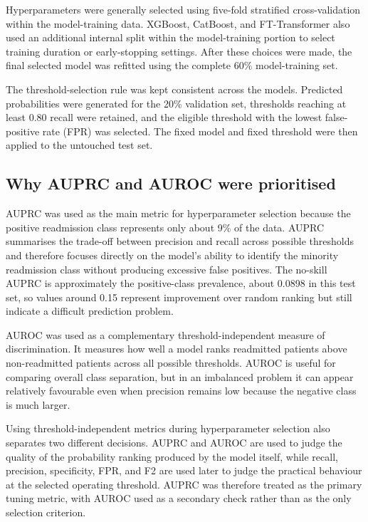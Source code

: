 \documentclass[11pt,a4paper]{article}
\begin{document}
Hyperparameters were generally selected using five-fold stratified cross-validation within the model-training data. XGBoost, CatBoost, and FT-Transformer also used an additional internal split within the model-training portion to select training duration or early-stopping settings. After these choices were made, the final selected model was refitted using the complete 60\% model-training set.

The threshold-selection rule was kept consistent across the models. Predicted probabilities were generated for the 20\% validation set, thresholds reaching at least 0.80 recall were retained, and the eligible threshold with the lowest false-positive rate (FPR) was selected. The fixed model and fixed threshold were then applied to the untouched test set.

\subsection{Why AUPRC and AUROC were prioritised}

AUPRC was used as the main metric for hyperparameter selection because the positive readmission class represents only about 9\% of the data. AUPRC summarises the trade-off between precision and recall across possible thresholds and therefore focuses directly on the model's ability to identify the minority readmission class without producing excessive false positives. The no-skill AUPRC is approximately the positive-class prevalence, about 0.0898 in this test set, so values around 0.15 represent improvement over random ranking but still indicate a difficult prediction problem.

AUROC was used as a complementary threshold-independent measure of discrimination. It measures how well a model ranks readmitted patients above non-readmitted patients across all possible thresholds. AUROC is useful for comparing overall class separation, but in an imbalanced problem it can appear relatively favourable even when precision remains low because the negative class is much larger.

Using threshold-independent metrics during hyperparameter selection also separates two different decisions. AUPRC and AUROC are used to judge the quality of the probability ranking produced by the model itself, while recall, precision, specificity, FPR, and F2 are used later to judge the practical behaviour at the selected operating threshold. AUPRC was therefore treated as the primary tuning metric, with AUROC used as a secondary check rather than as the only selection criterion.
\end{document}
